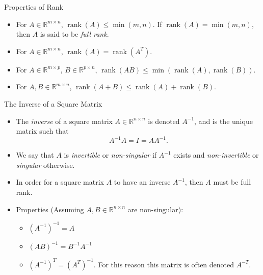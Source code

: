 \documentclass[aspectratio=169,12pt]{beamer}
\DeclareMathOperator{\rank}{rank}
\begin{document}
\begin{frame}[t]{Properties of Rank}
  \vspace{0.23cm}
  {\small
  \begin{itemize}
    \setlength{\itemsep}{0.36cm}
    \item For $A\in\mathbb{R}^{m\times n}$, $\rank(A)\le\min(m,n)$. If
          $\rank(A)=\min(m,n)$, then $A$ is said to be \emph{full rank}.
    \item For $A\in\mathbb{R}^{m\times n}$, $\rank(A)=\rank(A^T)$.
    \item For $A\in\mathbb{R}^{m\times p}$, $B\in\mathbb{R}^{p\times n}$,
          $\rank(AB)\le\min(\rank(A),\rank(B))$.
    \item For $A,B\in\mathbb{R}^{m\times n}$,
          $\rank(A+B)\le\rank(A)+\rank(B)$.
  \end{itemize}
  }
\end{frame}

\begin{frame}[t]{The Inverse of a Square Matrix}
  \vspace{-0.08cm}
  {\scriptsize
  \begin{itemize}
    \setlength{\itemsep}{0.15cm}
    \item The \emph{inverse} of a square matrix $A\in\mathbb{R}^{n\times n}$ is
          denoted $A^{-1}$, and is the unique matrix such that
          \[
            A^{-1}A=I=AA^{-1}.
          \]
    \item We say that $A$ is \emph{invertible} or \emph{non-singular} if $A^{-1}$
          exists and \emph{non-invertible} or \emph{singular} otherwise.
    \item In order for a square matrix $A$ to have an inverse $A^{-1}$, then $A$
          must be full rank.
    \item Properties (Assuming $A,B\in\mathbb{R}^{n\times n}$ are non-singular):
      \begin{itemize}
        \setlength{\itemsep}{0.05cm}
        \item $(A^{-1})^{-1}=A$
        \item $(AB)^{-1}=B^{-1}A^{-1}$
        \item $(A^{-1})^T=(A^T)^{-1}$. For this reason this matrix is often
              denoted $A^{-T}$.
      \end{itemize}
  \end{itemize}
  }
\end{frame}
\end{document}
